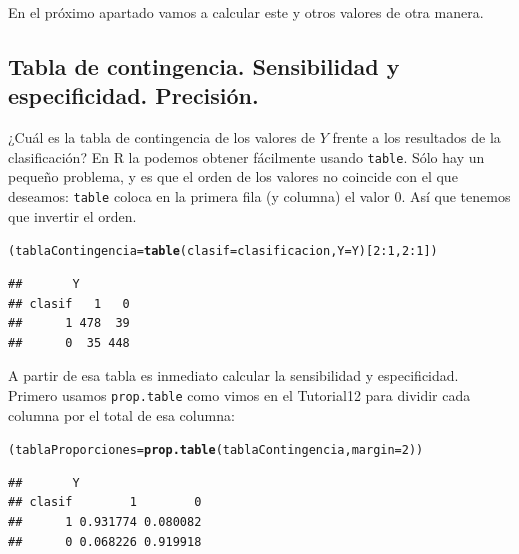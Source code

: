 \documentclass[10pt,a4paper]{article}\usepackage[]{graphicx}\usepackage[]{color}
\makeatletter
\newcommand{\hlnum}[1]{\textcolor[rgb]{0.686,0.059,0.569}{#1}}%
\newcommand{\hlopt}[1]{\textcolor[rgb]{0,0,0}{#1}}%
\newcommand{\hlstd}[1]{\textcolor[rgb]{0.345,0.345,0.345}{#1}}%
\newcommand{\hlkwb}[1]{\textcolor[rgb]{0.69,0.353,0.396}{#1}}%
\newcommand{\hlkwc}[1]{\textcolor[rgb]{0.333,0.667,0.333}{#1}}%
\newcommand{\hlkwd}[1]{\textcolor[rgb]{0.737,0.353,0.396}{\textbf{#1}}}%
\newenvironment{kframe}{%
 \def\at@end@of@kframe{}%
 \ifinner\ifhmode%
  \def\at@end@of@kframe{\end{minipage}}%
  \begin{minipage}{\columnwidth}%
 \fi\fi%
 \def\FrameCommand##1{\hskip\@totalleftmargin \hskip-\fboxsep
 \colorbox{shadecolor}{##1}\hskip-\fboxsep
     \hskip-\linewidth \hskip-\@totalleftmargin \hskip\columnwidth}%
 \MakeFramed {\advance\hsize-\width
   \@totalleftmargin\z@ \linewidth\hsize
   \@setminipage}}%
 {\par\unskip\endMakeFramed%
 \at@end@of@kframe}
\newenvironment{knitrout}{}{} %
\newcounter {cont01}
\makeatother
\begin{document}
En el próximo apartado vamos a calcular este y otros valores de otra manera.

\subsection{Tabla de contingencia. Sensibilidad y especificidad. Precisión.}
\label{tut13:subsec:TablaContingenciaSensibilidadEspecificidad}

¿Cuál es la tabla de contingencia de los valores de $Y$ frente a los resultados de la clasificación? En R la podemos obtener fácilmente usando {\tt table}. Sólo hay un pequeño problema,  y es que el orden de los valores no coincide con el que deseamos: {\tt table} coloca en la primera fila (y columna) el valor $0$. Así que tenemos que invertir el orden.

\begin{knitrout}
\color{fgcolor}\begin{kframe}
\begin{alltt}
\hlstd{(tablaContingencia} \hlkwb{=} \hlkwd{table}\hlstd{(}\hlkwc{clasif} \hlstd{= clasificacion,} \hlkwc{Y} \hlstd{= Y)[}\hlnum{2}\hlopt{:}\hlnum{1}\hlstd{,} \hlnum{2}\hlopt{:}\hlnum{1}\hlstd{])}
\end{alltt}
\begin{verbatim}
##       Y
## clasif   1   0
##      1 478  39
##      0  35 448
\end{verbatim}
\end{kframe}
\end{knitrout}




A partir de esa tabla es inmediato calcular la sensibilidad y especificidad. Primero usamos {\tt prop.table} como vimos en el Tutorial12 para dividir cada columna por el total de esa columna:

\begin{knitrout}
\color{fgcolor}\begin{kframe}
\begin{alltt}
\hlstd{(tablaProporciones} \hlkwb{=} \hlkwd{prop.table}\hlstd{(tablaContingencia,} \hlkwc{margin} \hlstd{=} \hlnum{2}\hlstd{))}
\end{alltt}
\begin{verbatim}
##       Y
## clasif        1        0
##      1 0.931774 0.080082
##      0 0.068226 0.919918
\end{verbatim}
\end{kframe}
\end{knitrout}
\end{document}
